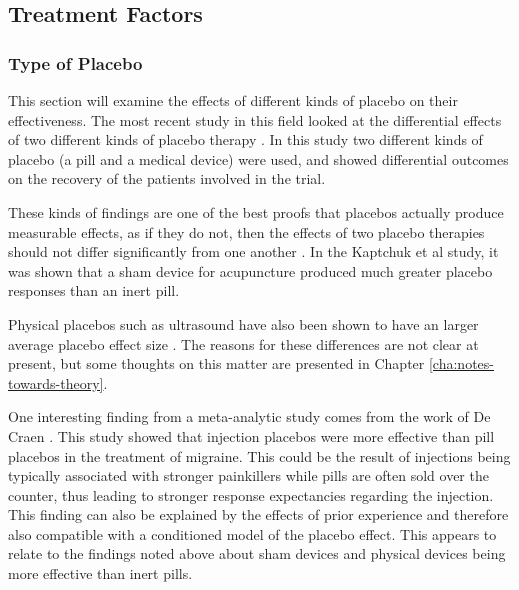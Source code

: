 
\subsection{Treatment Factors}

\subsubsection{Type of Placebo}
\label{sec:type-placebo}

This section will examine the effects of different kinds of placebo on their effectiveness. The most recent study in this field looked at the differential effects of two different kinds of placebo therapy \cite{Kaptchuk2006}. In this study two different kinds of placebo (a pill and a medical device) were used, and showed differential outcomes on the recovery of the patients involved in the trial. 

These kinds of findings are one of the best proofs  that placebos actually produce measurable effects, as if they do not, then the effects of two placebo therapies should not differ significantly from one another \cite{Kaptchuk2006}. In the Kaptchuk et al study, it was shown that a sham device for acupuncture produced much greater placebo responses than an inert pill. 

Physical placebos such as ultrasound have also been shown to have an larger average placebo effect size \cite{Ernst1995b}.  The reasons for these differences are not clear at present, but some thoughts on this matter are presented in Chapter \ref{cha:notes-towards-theory}. 

One interesting finding from a meta-analytic study comes from the work of De Craen \cite{Craen2000}. This study showed that injection placebos were more effective than pill placebos in the treatment of migraine. This could be the result of injections being typically associated with stronger painkillers while pills are often sold over the counter, thus leading to stronger response expectancies regarding the injection. This finding can also be explained by the effects of prior experience and therefore also compatible with a conditioned model of the placebo effect. This appears to relate to the findings noted above about sham devices and physical devices being more effective than inert pills. 

